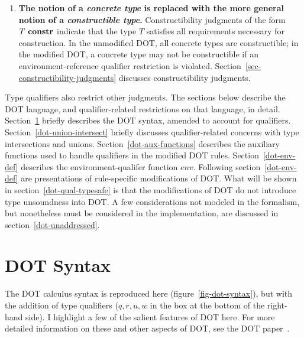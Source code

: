 \begin{enumerate}
\item {\bf The notion of a {\em concrete type} is replaced with the more general
notion of a {\em constructible type}.}
Constructibility judgments of the form~\mbox{$T\ {\bf constr}$} indicate
that the type $T$ satisfies all requirements necessary for construction.
In the unmodified DOT, all concrete types are constructible;
in the modified DOT, a concrete type may not be constructible if
an environment-reference qualifier restriction is violated.
Section~\ref{sec-constructibility-judgments} discusses constructibility judgments.


\end{enumerate}


Type qualifiers also restrict other judgments.
The sections below describe the DOT language, and qualifier-related restrictions
on that language, in detail.
Section~\ref{sec-dot-syntax} briefly describes the DOT syntax, amended to
account for qualifiers.
Section~\ref{dot-union-intersect} briefly discusses qualifier-related concerns
with type intersections and unions.
Section~\ref{dot-aux-functions} describes the auxiliary functions used to handle
qualifiers in the modified DOT rules.
Section~\ref{dot-env-def} describes the environment-qualifer function \mbox{$env$}.
Following section~\ref{dot-env-def} are presentations of rule-specific
modifications of DOT.
What will be shown in section~\ref{dot-qual-typesafe} is that the modifications
of DOT do not introduce type unsoundness into DOT.
A few considerations not modeled in the formalism, but nonetheless must be
considered in the implementation, are discussed in section~\ref{dot-unaddressed}.


\section{DOT Syntax}
\label{sec-dot-syntax}

The DOT calculus syntax is reproduced here (figure~\ref{fig-dot-syntax}),
but with the addition of type qualifiers ($q,r,u,w$ in the box at the bottom of
the right-hand side).
I highlight a few of the salient features of DOT here.
For more detailed information on these and other aspects of DOT, see the DOT paper~\cite{dot}.

